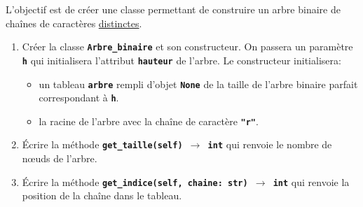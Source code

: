 \documentclass[a4paper,11pt]{article}
\begin{document}
\begin{exo}
    \begin{center}
        \label{classebinaire}
    \end{center}
    L'objectif est de créer une classe permettant de construire un arbre binaire de chaînes de caractères \underline{distinctes}.
    \begin{enumerate}
        \item Créer la classe \textbf{\texttt{Arbre\_binaire}} et son constructeur. On passera un paramètre \textbf{\texttt{h}} qui initialisera l'attribut \texttt{\textbf{hauteur}} de l'arbre. Le constructeur initialisera:
              \begin{itemize}
                  \item un tableau \textbf{\texttt{arbre}} rempli d'objet \textbf{\texttt{None}} de la taille de l'arbre binaire parfait correspondant à \textbf{\texttt{h}}.
                  \item la racine de l'arbre avec la chaîne de caractère \textbf{\texttt{"r"}}.
              \end{itemize}
        \item Écrire la méthode \textbf{\texttt{get\_taille(self) $\rightarrow$ int}} qui renvoie le nombre de nœuds de l'arbre.
        \item Écrire la méthode \textbf{\texttt{get\_indice(self, chaine: str) $\rightarrow$ int}} qui renvoie la position de la chaîne dans le tableau.

\end{enumerate}
\end{exo}
\end{document}
